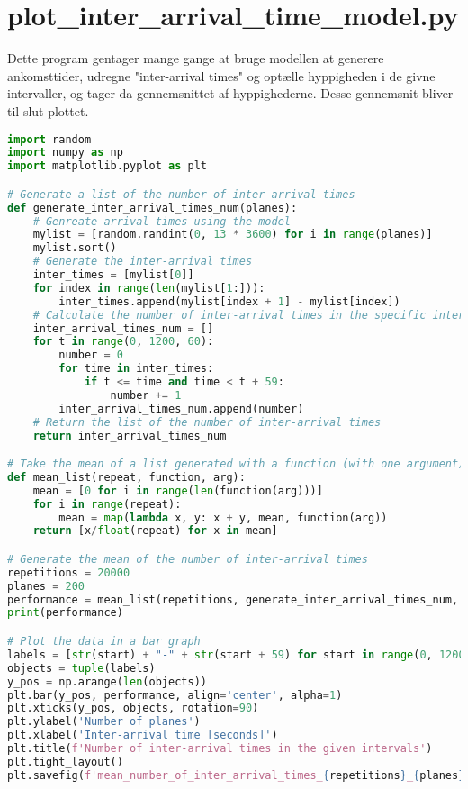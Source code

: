 \section{plot\_inter\_arrival\_time\_model.py}
Dette program gentager mange gange at bruge modellen at generere ankomsttider, udregne "inter-arrival times" og optælle hyppigheden i de givne intervaller, og tager da gennemsnittet af hyppighederne.
Desse gennemsnit bliver til slut plottet.

\begin{lstlisting}[language=Python, caption={plot\_inter\_arrival\_time\_model.py}]
import random
import numpy as np
import matplotlib.pyplot as plt

# Generate a list of the number of inter-arrival times
def generate_inter_arrival_times_num(planes):
    # Genreate arrival times using the model
    mylist = [random.randint(0, 13 * 3600) for i in range(planes)]
    mylist.sort()
    # Generate the inter-arrival times
    inter_times = [mylist[0]]
    for index in range(len(mylist[1:])):
        inter_times.append(mylist[index + 1] - mylist[index])
    # Calculate the number of inter-arrival times in the specific intervals
    inter_arrival_times_num = []
    for t in range(0, 1200, 60):
        number = 0
        for time in inter_times:
            if t <= time and time < t + 59:
                number += 1
        inter_arrival_times_num.append(number)
    # Return the list of the number of inter-arrival times
    return inter_arrival_times_num

# Take the mean of a list generated with a function (with one argument) when run many times
def mean_list(repeat, function, arg):
    mean = [0 for i in range(len(function(arg)))]
    for i in range(repeat):
        mean = map(lambda x, y: x + y, mean, function(arg)) 
    return [x/float(repeat) for x in mean]

# Generate the mean of the number of inter-arrival times
repetitions = 20000
planes = 200
performance = mean_list(repetitions, generate_inter_arrival_times_num, planes)
print(performance)

# Plot the data in a bar graph
labels = [str(start) + "-" + str(start + 59) for start in range(0, 1200, 60)]
objects = tuple(labels)
y_pos = np.arange(len(objects))
plt.bar(y_pos, performance, align='center', alpha=1)
plt.xticks(y_pos, objects, rotation=90)
plt.ylabel('Number of planes')
plt.xlabel('Inter-arrival time [seconds]')
plt.title(f'Number of inter-arrival times in the given intervals')
plt.tight_layout()
plt.savefig(f'mean_number_of_inter_arrival_times_{repetitions}_{planes}.png')
\end{lstlisting}

